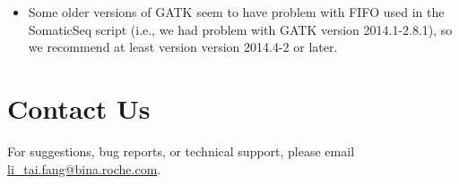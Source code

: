 \documentclass[10pt,letterpaper]{article}
\begin{document}
\begin{sloppypar}
\begin{itemize}

  \item
  Some older versions of GATK seem to have problem with FIFO used in the SomaticSeq script (i.e., we had problem with GATK version 2014.1-2.8.1), so we recommend at least version version 2014.4-2 or later.

\end{itemize}






\section{Contact Us}
For suggestions, bug reports, or technical support, please email \href{mailto:li_tai.fang@bina.roche.com}{li\_tai.fang@bina.roche.com}.


\end{sloppypar}
\end{document}
